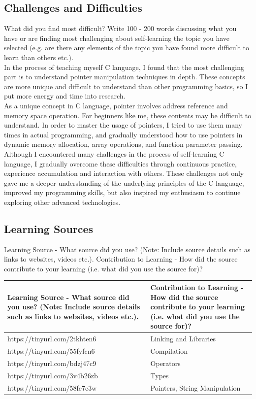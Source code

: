 \documentclass[a4paper, 11pt]{report}
\begin{document}
\subsection{Challenges and Difficulties}
What did you find most difficult? Write 100 - 200 words discussing what you have or are finding most challenging about self-learning the topic you have selected (e.g. are there any elements of the topic you have found more difficult to learn than others etc.).\\

In the process of teaching myself C language, I found that the most challenging part is to understand pointer manipulation techniques in depth. These concepts are more unique and difficult to understand than other programming basics, so I put more energy and time into research.\\

As a unique concept in C language, pointer involves address reference and memory space operation. For beginners like me, these contents may be difficult to understand. In order to master the usage of pointers, I tried to use them many times in actual programming, and gradually understood how to use pointers in dynamic memory allocation, array operations, and function parameter passing.\\

Although I encountered many challenges in the process of self-learning C language, I gradually overcome these difficulties through continuous practice, experience accumulation and interaction with others. These challenges not only gave me a deeper understanding of the underlying principles of the C language, improved my programming skills, but also inspired my enthusiasm to continue exploring other advanced technologies.\\


\subsection{Learning Sources}
Learning Source - What source did you use? (Note: Include source details such as links to websites, videos etc.).	Contribution to Learning - How did the source contribute to your learning (i.e. what did you use the source for)?

\begin{tabular}{|p{}|p{}|}
	\hline
	Learning Source - What source did you use? (Note: Include source details such as links to websites, videos etc.). & Contribution to Learning - How did the source contribute to your learning (i.e. what did you use the source for)?\\
	\hline
	https://tinyurl.com/2tkhten6 & Linking and Libraries\\
	\hline
	https://tinyurl.com/55fyfcn6 & Compilation\\
	\hline
	https://tinyurl.com/bdzj47c9 & Operators\\
	\hline
	https://tinyurl.com/3v4b26zb & Types\\
	\hline
	https://tinyurl.com/58fe7c3w & Pointers, String Manipulation\\
	\hline
\end{tabular}
\end{document}
